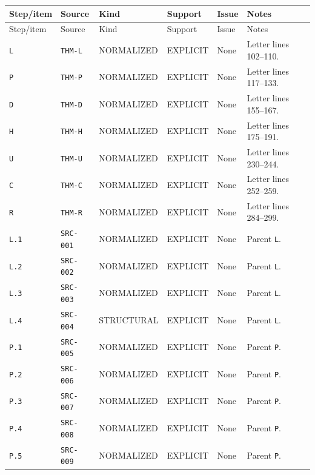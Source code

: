 \documentclass[11pt,letterpaper]{article}
\begin{document}
{\footnotesize \begin{longtable}{>{\raggedright\arraybackslash}p{.11\linewidth}>{\raggedright\arraybackslash}p{.12\linewidth}>{\raggedright\arraybackslash}p{.15\linewidth}>{\raggedright\arraybackslash}p{.13\linewidth}>{\raggedright\arraybackslash}p{.06\linewidth}>{\raggedright\arraybackslash}p{.29\linewidth}}
\toprule
Step/item & Source & Kind & Support & Issue & Notes \\
\midrule\endfirsthead
\toprule
Step/item & Source & Kind & Support & Issue & Notes \\
\midrule\endhead
\bottomrule\endfoot
\texttt{L} & \texttt{THM-L} & NORMALIZED & EXPLICIT & None & Letter lines 102--110. \\[3pt]
\texttt{P} & \texttt{THM-P} & NORMALIZED & EXPLICIT & None & Letter lines 117--133. \\[3pt]
\texttt{D} & \texttt{THM-D} & NORMALIZED & EXPLICIT & None & Letter lines 155--167. \\[3pt]
\texttt{H} & \texttt{THM-H} & NORMALIZED & EXPLICIT & None & Letter lines 175--191. \\[3pt]
\texttt{U} & \texttt{THM-U} & NORMALIZED & EXPLICIT & None & Letter lines 230--244. \\[3pt]
\texttt{C} & \texttt{THM-C} & NORMALIZED & EXPLICIT & None & Letter lines 252--259. \\[3pt]
\texttt{R} & \texttt{THM-R} & NORMALIZED & EXPLICIT & None & Letter lines 284--299. \\[3pt]
\texttt{L.1} & \texttt{SRC-001} & NORMALIZED & EXPLICIT & None & Parent \texttt{L}. \\[3pt]
\texttt{L.2} & \texttt{SRC-002} & NORMALIZED & EXPLICIT & None & Parent \texttt{L}. \\[3pt]
\texttt{L.3} & \texttt{SRC-003} & NORMALIZED & EXPLICIT & None & Parent \texttt{L}. \\[3pt]
\texttt{L.4} & \texttt{SRC-004} & STRUCTURAL & EXPLICIT & None & Parent \texttt{L}. \\[3pt]
\texttt{P.1} & \texttt{SRC-005} & NORMALIZED & EXPLICIT & None & Parent \texttt{P}. \\[3pt]
\texttt{P.2} & \texttt{SRC-006} & NORMALIZED & EXPLICIT & None & Parent \texttt{P}. \\[3pt]
\texttt{P.3} & \texttt{SRC-007} & NORMALIZED & EXPLICIT & None & Parent \texttt{P}. \\[3pt]
\texttt{P.4} & \texttt{SRC-008} & NORMALIZED & EXPLICIT & None & Parent \texttt{P}. \\[3pt]
\texttt{P.5} & \texttt{SRC-009} & NORMALIZED & EXPLICIT & None & Parent \texttt{P}. \\[3pt]

\end{longtable}}
\end{document}
